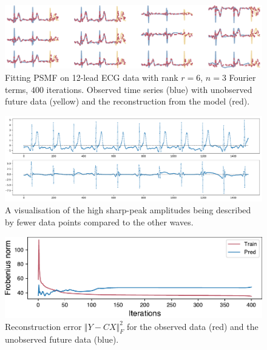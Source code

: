 \documentclass{mldsmsc}
\begin{document}
\begin{figure}[h]
\begin{center}
\includegraphics[scale=1]{images/forecast/periodic_fit.pdf}
\caption{Fitting PSMF on 12-lead ECG data with rank $r = 6$, $n = 3$ Fourier terms, $400$ iterations. Observed time series (blue) with unobserved future data (yellow) and the reconstruction from the model (red).}
\label{forecast}
\end{center}
\end{figure}

\begin{figure}[h]
\begin{center}
\includegraphics[scale=0.4]{images/example.pdf}
\caption{A visualisation of the high sharp-peak amplitudes being described by fewer data points compared to the other waves.}
\label{problem}
\end{center}
\end{figure}

\begin{figure}[h]
\begin{center}
\includegraphics[scale=1]{images/forecast/periodic_cost.pdf}
\caption{Reconstruction error $\Vert Y - CX \Vert^2_F$ for the observed data (red) and the unobserved future data (blue).}
\label{loss}
\end{center}
\end{figure}
\end{document}
